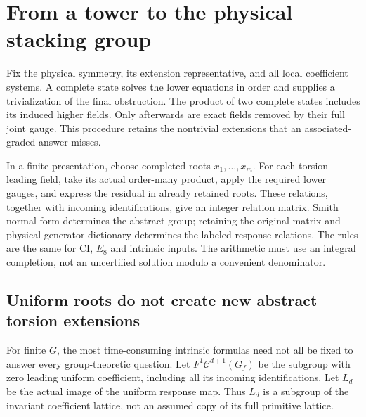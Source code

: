 \section{From a tower to the physical stacking group}\label{sec:classification}
Fix the physical symmetry, its extension representative, and all local coefficient systems. A complete state solves the lower equations in order and supplies a trivialization of the final obstruction. The product of two complete states includes its induced higher fields. Only afterwards are exact fields removed by their full joint gauge. This procedure retains the nontrivial extensions that an associated-graded answer misses.

In a finite presentation, choose completed roots $x_1,\ldots,x_m$. For each torsion leading field, take its actual order-many product, apply the required lower gauges, and express the residual in already retained roots. These relations, together with incoming identifications, give an integer relation matrix. Smith normal form determines the abstract group; retaining the original matrix and physical generator dictionary determines the labeled response relations. The rules are the same for CI, $E_8$ and intrinsic inputs. The arithmetic must use an integral completion, not an uncertified solution modulo a convenient denominator.

\subsection{Uniform roots do not create new abstract torsion extensions}
For finite $G$, the most time-consuming intrinsic formulas need not all be fixed to answer every group-theoretic question. Let $F^1\mathcal C^{d+1}(G_f)$ be the subgroup with zero leading uniform coefficient, including all its incoming identifications. Let $L_d$ be the actual image of the uniform response map. Thus $L_d$ is a subgroup of the invariant coefficient lattice, not an assumed copy of its full primitive lattice.


